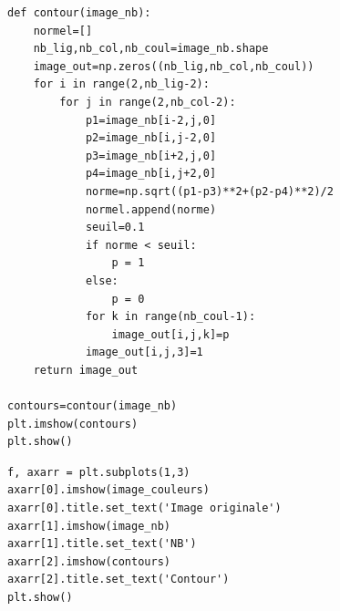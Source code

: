 \reponse{}

\begin{verbatim}
def contour(image_nb):
    normel=[]
    nb_lig,nb_col,nb_coul=image_nb.shape
    image_out=np.zeros((nb_lig,nb_col,nb_coul))
    for i in range(2,nb_lig-2):
        for j in range(2,nb_col-2):
            p1=image_nb[i-2,j,0]
            p2=image_nb[i,j-2,0]
            p3=image_nb[i+2,j,0]
            p4=image_nb[i,j+2,0]
            norme=np.sqrt((p1-p3)**2+(p2-p4)**2)/2
            normel.append(norme)
            seuil=0.1
            if norme < seuil:
                p = 1
            else:
                p = 0
            for k in range(nb_coul-1):
                image_out[i,j,k]=p
            image_out[i,j,3]=1
    return image_out

contours=contour(image_nb)
plt.imshow(contours)
plt.show()
\end{verbatim}

\reponse{}

\begin{verbatim}
f, axarr = plt.subplots(1,3)
axarr[0].imshow(image_couleurs)
axarr[0].title.set_text('Image originale')
axarr[1].imshow(image_nb)
axarr[1].title.set_text('NB')
axarr[2].imshow(contours)
axarr[2].title.set_text('Contour')
plt.show()
\end{verbatim}




